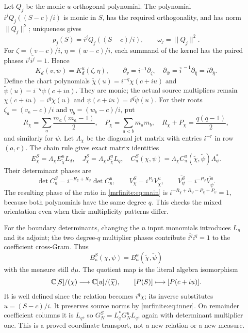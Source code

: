 \documentclass[11pt]{article}
\begin{document}
Let \(Q_j\) be the monic \(u\)-orthogonal polynomial. The polynomial
\(i^jQ_j((S-c)/i)\) is monic in \(S\), has the required
orthogonality, and has norm \(\|Q_j\|^2\); uniqueness gives
\[
 p_j(S)=i^jQ_j((S-c)/i),\qquad \omega_j=\|Q_j\|^2.
\]
For \(\zeta=(v-c)/i\), \(\eta=(w-c)/i\), each summand of the kernel
has the paired phases \(i^j\overline{i^j}=1\). Hence
\[
 K_d(v,\overline w)=K_d^u(\zeta,\overline\eta),\qquad
 \partial_v=i^{-1}\partial_\zeta,\quad
 \partial_{\overline w}=\overline{i}^{\,-1}\partial_{\overline\eta}
                         =i\partial_{\overline\eta}.
\]
Define the chart polynomials
\(\widetilde\chi(u)=i^{-q}\chi(c+iu)\) and
\(\widetilde\psi(u)=i^{-q}\psi(c+iu)\). They are monic; the actual
source multipliers remain
\(\chi(c+iu)=i^q\widetilde\chi(u)\) and
\(\psi(c+iu)=i^q\widetilde\psi(u)\).
For their roots \(\zeta_a=(v_a-c)/i\) and
\(\eta_b=(w_b-c)/i\), put
\[
 R_\chi=\sum_a\frac{m_a(m_a-1)}2,\quad
 P_\chi=\sum_{a<b}m_am_b,\quad
 R_\chi+P_\chi=\frac{q(q-1)}2,
\]
and similarly for \(\psi\). Let \(\Lambda_\chi\) be the diagonal
jet matrix with entries \(i^{-r}\) in row \((a,r)\).
The chain rule gives exact matrix identities
\begin{equation}\label{mrfinite:eq:jetphases}
 E_\chi^S=\Lambda_\chi E_{\widetilde\chi}^{u}L_d,
 \quad J_\chi^S=\Lambda_\chi J_{\widetilde\chi}^{u}L_q,
 \quad C_n^S(\chi,\psi)
       =\Lambda_\chi C_n^u(\widetilde\chi,\widetilde\psi)
                          \Lambda_\psi^*.
\end{equation}
Their determinant phases are
\[
 \det C_n^S=i^{-R_\chi+R_\psi}\det C_n^u,\qquad
 V_\chi^S=i^{P_\chi}V_{\widetilde\chi}^{u},\qquad
 \overline{V_\psi^S}=i^{-P_\psi}\overline{V_{\widetilde\psi}^{u}}.
\]
The resulting phase of the ratio in \eqref{mrfinite:eq:main} is
\(i^{-R_\chi+R_\psi-P_\chi+P_\psi}=1\), because both polynomials
have the same degree \(q\). This checks the mixed orientation even
when their multiplicity patterns differ.

For the boundary determinants, changing the \(n\) input monomials
introduces \(L_n\) and its adjoint; the two degree-\(q\) multiplier
phases contribute \(\overline{i^q}i^q=1\) to the coefficient
cross-Gram. Thus
\[
 B_n^S(\chi,\psi)=B_n^u(\widetilde\chi,\widetilde\psi)
\]
with the measure still \(d\mu\). The quotient map is the literal
algebra isomorphism
\[
 \mathbb C[S]/(\chi)\longrightarrow\mathbb C[u]/(\widetilde\chi),
 \qquad[P(S)]\longmapsto[P(c+iu)].
\]
It is well defined since the relation becomes
\(i^q\widetilde\chi\); its inverse substitutes \(u=(S-c)/i\).
It preserves source norms by \eqref{mrfinite:eq:inner}. On remainder coefficient
columns it is \(L_q\), so
\(G_N^S=L_q^*G_N^uL_q\), again with determinant multiplier one.
This is a proved coordinate transport, not a new relation or a new
measure.
\end{document}
